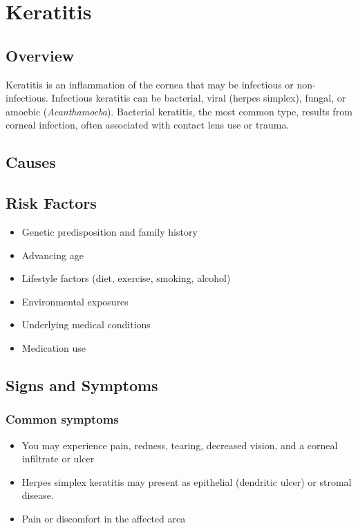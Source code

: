 \chapter{Keratitis}
\label{sec:Keratitis}

\section{Overview}
Keratitis is an inflammation of the cornea that may be infectious or non-infectious. Infectious keratitis can be bacterial, viral (herpes simplex), fungal, or amoebic (\textit{Acanthamoeba}). Bacterial keratitis, the most common type, results from corneal infection, often associated with contact lens use or trauma.
\section{Causes}
\section{Risk Factors}

\begin{itemize}[noitemsep]
  \item Genetic predisposition and family history
  \item Advancing age
  \item Lifestyle factors (diet, exercise, smoking, alcohol)
  \item Environmental exposures
  \item Underlying medical conditions
  \item Medication use
\end{itemize}
\section{Signs and Symptoms}

\subsection{Common symptoms}
\begin{itemize}[noitemsep]
  \item You may experience pain, redness, tearing, decreased vision, and a corneal infiltrate or ulcer
  \item Herpes simplex keratitis may present as epithelial (dendritic ulcer) or stromal disease.
  \item Pain or discomfort in the affected area
  \end{itemize}

